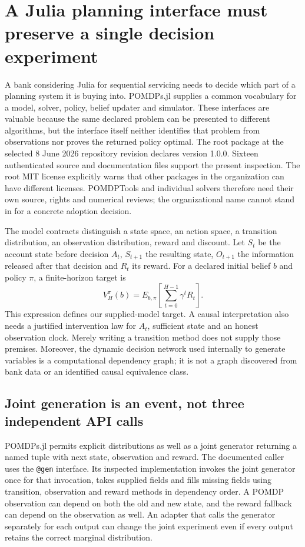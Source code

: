 \section{A Julia planning interface must preserve a single decision experiment}
\label{exec23:pomdpsjl-scope}

A bank considering Julia for sequential servicing needs to decide which part
of a planning system it is buying into. POMDPs.jl supplies a common vocabulary
for a model, solver, policy, belief updater and simulator. These interfaces are
valuable because the same declared problem can be presented to different
algorithms, but the interface itself neither identifies that problem from
observations nor proves the returned policy optimal. The root package at the
selected 8 June 2026 repository revision declares version 1.0.0. Sixteen
authenticated source and documentation files support the present inspection.
The root MIT license explicitly warns that other packages in the organization
can have different licenses. POMDPTools and individual solvers therefore need
their own source, rights and numerical reviews; the organizational name cannot
stand in for a concrete adoption decision.
\citep{exec23_pomdpsjl_sources}

The model contracts distinguish a state space, an action space, a transition
distribution, an observation distribution, reward and discount. Let
$S_t$ be the account state before decision $A_t$, $S_{t+1}$ the resulting state,
$O_{t+1}$ the information released after that decision and $R_t$ its reward.
For a declared initial belief $b$ and policy $\pi$, a finite-horizon target is
\[
 V_H^\pi(b)=E_{b,\pi}\!\left[\sum_{t=0}^{H-1}\gamma^tR_t\right].
\]
This expression defines our supplied-model target. A causal interpretation
also needs a justified intervention law for $A_t$, sufficient state and an
honest observation clock. Merely writing a transition method does not supply
those premises. Moreover, the dynamic decision network used internally to
generate variables is a computational dependency graph; it is not a graph
discovered from bank data or an identified causal equivalence class.
\citep{exec23_pomdpsjl_sources,exec23_pomdpsjl_reference}

\subsection{Joint generation is an event, not three independent API calls}
\label{exec23:pomdpsjl-generation}

POMDPs.jl permits explicit distributions as well as a joint generator returning
a named tuple with next state, observation and reward. The documented caller
uses the \texttt{@gen} interface. Its inspected implementation invokes the
joint generator once for that invocation, takes supplied fields and fills
missing fields using transition, observation and reward methods in dependency
order. A POMDP observation can depend on both the old and new state, and the
reward fallback can depend on the observation as well. An adapter that calls
the generator separately for each output can change the joint experiment even
if every output retains the correct marginal distribution.
\citep{exec23_pomdpsjl_sources}

